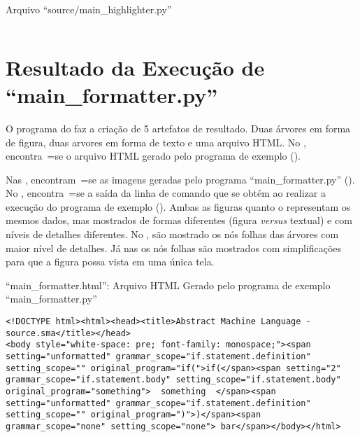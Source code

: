 \begin{code}
\caption{Arquivo ``source/main\_highlighter.py''}
\label{MainHighlighterPy}
\inputminted{python3}{../source/main_highlighter.py}
\end{code}


\section{Resultado da Execução de ``main\_formatter.py''}

O programa do  faz a criação de 5 artefatos de resultado.
Duas árvores em forma de figura,
duas arvores em forma de texto e
uma arquivo HTML.
No ,
encontra~=se o arquivo HTML gerado pelo programa de exemplo ().

Nas ,
encontram~=se as imagens geradas pelo programa ``main\_formatter.py'' ().
No ,
encontra~=se a saída da linha de comando que se obtém ao realizar a execução do programa de exemplo ().
Ambas as figuras  quanto o  representam os mesmos dados,
mas mostrados de formas diferentes (figura \textit{versus} textual) e
com níveis de detalhes diferentes.
No ,
são mostrado os nós folhas das árvores com maior nível de detalhes.
Já nas  os nós folhas são mostrados com simplificações para que a figura possa vista em uma única tela.
\begin{code}
\caption{``main\_formatter.html'': Arquivo HTML Gerado pelo programa de exemplo ``main\_formatter.py''}
\label{MainFormatterHtml}
\begin{verbatim}
<!DOCTYPE html><html><head><title>Abstract Machine Language - source.sma</title></head>
<body style="white-space: pre; font-family: monospace;"><span setting="unformatted" grammar_scope="if.statement.definition" setting_scope="" original_program="if(">if(</span><span setting="2" grammar_scope="if.statement.body" setting_scope="if.statement.body" original_program="something">  something  </span><span setting="unformatted" grammar_scope="if.statement.definition" setting_scope="" original_program=")">)</span><span grammar_scope="none" setting_scope="none"> bar</span></body></html>
\end{verbatim}
\end{code}

